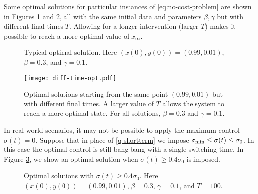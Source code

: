 \documentclass[english,12pt,letter]{article}
\newcommand{\Rnot}{\sigma_0}
\newcommand{\Sinf}{x_\infty}
\begin{document}
Some optimal solutions for particular instances of \eqref{eq:no-cost-problem}
are shown in Figures \ref{fig:example1} and \ref{fig:diff-time-opt},
all with the same initial data and parameters $\beta, \gamma$ but with different final
times $T$.  Allowing for a longer intervention (larger $T$) makes it possible to reach
a more optimal value of $\Sinf$.

\begin{figure}
    \centering
    \caption{Typical optimal solution.  Here $(x(0),y(0)) = (0.99,0.01)$, $\beta=0.3$, and $\gamma=0.1$.\label{fig:example1}}
\end{figure}

\begin{figure}
    \centering
    \texttt{[image: diff-time-opt.pdf]}
    \caption{Optimal solutions starting from the same point $(0.99,0.01)$ but with different
        final times.  A larger value of $T$ allows the system to reach a more optimal state.
        For all solutions, $\beta=0.3$ and $\gamma=0.1$.\label{fig:diff-time-opt}}
\end{figure}

In real-world scenarios, it may not be possible to apply the maximum control $\sigma(t)=0$.
Suppose that in place of \eqref{q-shortterm} we impose $\sigma_\textup{min} \le \sigma(t) \le \Rnot$.
In this case the optimal control is still bang-bang with a single switching time.
In Figure \ref{fig:example_2}, we show an optimal solution when $\sigma(t)\ge 0.4\Rnot$ is imposed.

\begin{figure}
    \centering
    \caption{Optimal solutions with $\sigma(t)\ge 0.4\Rnot$.  Here $(x(0),y(0)) = (0.99,0.01)$, $\beta=0.3$, $\gamma=0.1$, and $T=100$.\label{fig:example_2}}
\end{figure}
\end{document}
